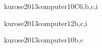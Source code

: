 \begin{syllabus}
\begin{unit}{\NCReliableDataDelivery}{}{kurose2013computer}{10}{C6,b,c,i}
\begin{topics}%
    \item \NCReliableDataDeliveryTopicError
    \item \NCReliableDataDeliveryTopicFlow
    \item \NCReliableDataDeliveryTopicPerformance
    \item \NCReliableDataDeliveryTopicTcp
\end{topics}
\begin{learningoutcomes}
	\item \NCReliableDataDeliveryLODescribeTheReliable [\Familiarity]
	\item \NCReliableDataDeliveryLOListTheAffect [\Familiarity]
	\item \NCReliableDataDeliveryLODesignAndSimple [\Usage]
\end{learningoutcomes}
\end{unit}

\begin{unit}{\NCRoutingandForwarding}{}{kurose2013computer}{12}{b,c,i}
\begin{topics}%
    \item \NCRoutingandForwardingTopicRouting
    \item \NCRoutingandForwardingTopicStatic
    \item \NCRoutingandForwardingTopicInternet
    \item \NCRoutingandForwardingTopicScalability
\end{topics}
\begin{learningoutcomes}
	\item \NCRoutingandForwardingLODescribeTheThe [\Familiarity]
	\item \NCRoutingandForwardingLODescribeHowForwarded [\Familiarity]
	\item \NCRoutingandForwardingLOListTheOf [\Familiarity]
\end{learningoutcomes}
\end{unit}

\begin{unit}{\NCLocalAreaNetworks}{}{kurose2013computer}{10}{b,c}
\begin{topics}%
    \item \NCLocalAreaNetworksTopicMultiple
    \item \NCLocalAreaNetworksTopicCommon
    \item \NCLocalAreaNetworksTopicLocal
    \item \NCLocalAreaNetworksTopicEthernet
    \item \NCLocalAreaNetworksTopicSwitching
\end{topics}
\begin{learningoutcomes}
	\item \NCLocalAreaNetworksLODescribeHowForwardedEthernet [\Familiarity]
	\item \NCLocalAreaNetworksLODescribeTheIp [\Familiarity]
	\item \NCLocalAreaNetworksLODescribeTheIn [\Familiarity]
\end{learningoutcomes}
\end{unit}


\end{syllabus}
